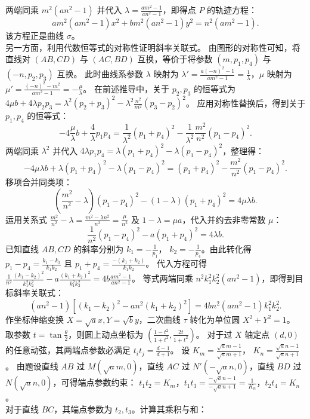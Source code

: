 \begin{solution}
两端同乘 $m^2(an^2 - 1)$ 并代入 $\lambda = \frac{am^2 - 1}{an^2 - 1}$，即得点 $P$ 的轨迹方程：
\[ am^2(am^2 - 1)x^2 + bm^2(an^2 - 1)y^2 = n^2(am^2 - 1). \]
该方程正是曲线 $\sigma$。\\
另一方面，利用代数恒等式的对称性证明斜率关联式。
由图形的对称性可知，将直线对 $(AB, CD)$ 与 $(AC, BD)$ 互换，等价于将参数 $(m, p_1, p_4)$ 与 $(-n, p_2, p_3)$ 互换。
此时曲线系参数 $\lambda$ 映射为 $\lambda' = \frac{a(-n)^2 - 1}{am^2 - 1} = \frac{1}{\lambda}$，$\mu$ 映射为 $\mu' = \frac{(-n)^2 - m^2}{am^2 - 1} = -\frac{\mu}{\lambda}$。
在前述推导中，关于 $p_2, p_3$ 的恒等式为 $4\mu b + 4\lambda p_2 p_3 = \lambda^2 (p_2 + p_3)^2 - \lambda^2 \frac{n^2}{m^2} (p_3 - p_2)^2$。
应用对称性替换后，得到关于 $p_1, p_4$ 的恒等式：
\[ -4\frac{\mu}{\lambda} b + \frac{4}{\lambda} p_1 p_4 = \frac{1}{\lambda^2} (p_1 + p_4)^2 - \frac{1}{\lambda^2} \frac{m^2}{n^2} (p_1 - p_4)^2. \]
两端同乘 $\lambda^2$ 并代入 $4\lambda p_1 p_4 = \lambda(p_1 + p_4)^2 - \lambda(p_1 - p_4)^2$，整理得：
\[ -4\mu \lambda b + \lambda(p_1 + p_4)^2 - \lambda(p_1 - p_4)^2 = (p_1 + p_4)^2 - \frac{m^2}{n^2}(p_1 - p_4)^2. \]
移项合并同类项：
\[ \left(\frac{m^2}{n^2} - \lambda\right)(p_1 - p_4)^2 - (1 - \lambda)(p_1 + p_4)^2 = 4\mu \lambda b. \]
运用关系式 $\frac{m^2}{n^2} - \lambda = \frac{m^2 - \lambda n^2}{n^2} = \frac{\mu}{n^2}$ 及 $1 - \lambda = \mu a$，代入并约去非零常数 $\mu$：
\[ \frac{1}{n^2}(p_1 - p_4)^2 - a(p_1 + p_4)^2 = 4\lambda b. \]
已知直线 $AB, CD$ 的斜率分别为 $k_1 = -\frac{1}{p_1}$， $k_2 = -\frac{1}{p_4}$。由此转化得 $p_1 - p_4 = \frac{k_1 - k_2}{k_1 k_2}$ 且 $p_1 + p_4 = \frac{-(k_1 + k_2)}{k_1 k_2}$。
代入方程可得 $\frac{1}{n^2} \frac{(k_1 - k_2)^2}{k_1^2 k_2^2} - a \frac{(k_1 + k_2)^2}{k_1^2 k_2^2} = 4b \frac{am^2 - 1}{an^2 - 1}$。
等式两端同乘 $n^2 k_1^2 k_2^2 (an^2 - 1)$，即得到目标斜率关联式：
\[ (an^2 - 1) \left[ (k_1 - k_2)^2 - an^2(k_1 + k_2)^2 \right] = 4bn^2 (am^2 - 1) k_1^2 k_2^2. \]
作坐标伸缩变换 $X = \sqrt{a}x, Y = \sqrt{b}y$，二次曲线 $\tau$ 转化为单位圆 $X^2 + Y^2 = 1$。
取参数 $t = \tan \frac{\theta}{2}$，则圆上动点坐标为 $\left(\frac{1-t^2}{1+t^2}, \frac{2t}{1+t^2}\right)$。
对于过 $X$ 轴定点 $(d, 0)$ 的任意动弦，其两端点参数必满足 $t_i t_j = \frac{d - 1}{d + 1}$。
设 $K_m = \frac{\sqrt{a}m - 1}{\sqrt{a}m + 1}$， $K_n = \frac{\sqrt{a}n - 1}{\sqrt{a}n + 1}$。
由题设直线 $AB$ 过 $M(\sqrt{a}m, 0)$，直线 $AC$ 过 $N'(-\sqrt{a}n, 0)$，直线 $BD$ 过 $N(\sqrt{a}n, 0)$，可得端点参数约束：
$t_1 t_2 = K_m$，$t_1 t_3 = \frac{-\sqrt{a}n - 1}{-\sqrt{a}n + 1} = \frac{1}{K_n}$，$t_2 t_4 = K_n$。\\
对于直线 $BC$，其端点参数为 $t_2, t_3$。计算其乘积与和：

\end{solution}
